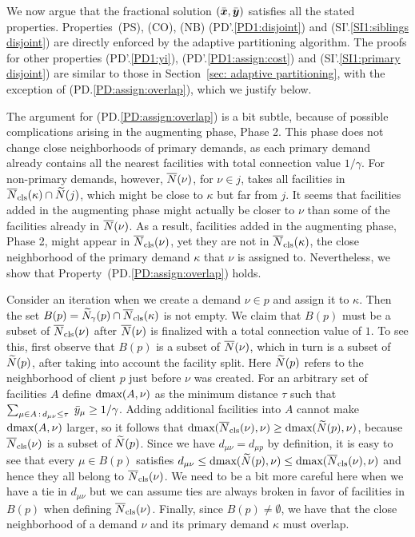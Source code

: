 \documentclass[11pt]{article}
\begin{document}
\smallskip

We now argue that the fractional solution $(\bar{\boldsymbol{x}},\bar{\boldsymbol{y}})$
satisfies all the stated properties. Properties~(PS), (CO), (NB)
(PD'.\ref{PD1:disjoint}) and (SI'.\ref{SI1:siblings disjoint}) are
directly enforced by the adaptive partitioning algorithm. The proofs
for other properties (PD'.\ref{PD1:yi}), (PD'.\ref{PD1:assign:cost})
and (SI'.\ref{SI1:primary disjoint}) are similar to those in
Section~\ref{sec: adaptive partitioning}, with the exception of
(PD.\ref{PD:assign:overlap}), which we justify below.

The argument for (PD.\ref{PD:assign:overlap}) is a bit subtle, because
of possible complications arising in the augmenting phase, Phase 2.
This phase does not change close neighborhoods of primary demands, as
each primary demand already contains all the nearest facilities with
total connection value $1/\gamma$.  For non-primary demands, however,
${\overline{N}}(\nu)$, for $\nu\in j$, takes all facilities in
${\overline{N}}_{\text{cls}}(\kappa)\cap {\widetilde N}(j)$, which might be close to $\kappa$
but far from $j$.  It seems that facilities added in the augmenting
phase might actually be closer to $\nu$ than some of the facilities
already in ${\overline{N}}(\nu)$. As a result, facilities added in the
augmenting phase, Phase 2, might appear in ${\overline{N}}_{\text{cls}}(\nu)$, yet they
are not in ${\overline{N}}_{\text{cls}}(\kappa)$, the close neighborhood of the primary
demand $\kappa$ that $\nu$ is assigned to.  Nevertheless, we show that
Property~(PD.\ref{PD:assign:overlap}) holds.

Consider an iteration when we create a demand $\nu\in p$
and assign it to $\kappa$. Then the set
$B(p)={\widetilde N}_{\gamma}(p)\cap {\overline{N}}_{\text{cls}}(\kappa)$ is not empty.
We claim that
$B(p)$ must be a subset of ${\overline{N}}_{\text{cls}}(\nu)$ after ${\overline{N}}(\nu)$ is
finalized with a total connection value of $1$. To see this, first
observe that $B(p)$ is a subset of ${\overline{N}}(\nu)$, which in turn is a
subset of ${\widetilde N}(p)$, after taking into account the facility
split. Here ${\widetilde N}(p)$ refers to the neighborhood of client $p$
just before $\nu$ was created. For an arbitrary set of facilities
$A$ define $\text{dmax}(A, \nu)$ as the minimum distance $\tau$ such
that $\sum_{\mu\in A {\,:\,} d_{\mu\nu} \leq \tau}\;{\bar y}_{\mu} \geq
1/\gamma$.
Adding additional facilities into $A$ cannot make
$\text{dmax}(A, \nu)$ larger, so it follows that $\text{dmax}({\overline{N}}_{\text{cls}}(\nu), \nu)
\geq \text{dmax}({\widetilde N}(p), \nu)$, because ${\overline{N}}_{\text{cls}}(\nu)$ is a subset of
${\widetilde N}(p)$. Since we have $d_{\mu \nu} = d_{\mu p}$ by definition,
it is easy to see that every $\mu \in B(p)$ satisfies $d_{\mu \nu}
\leq \text{dmax}({\widetilde N}(p), \nu) \leq \text{dmax}({\overline{N}}_{\text{cls}}(\nu), \nu)$ and
hence they all belong to ${\overline{N}}_{\text{cls}}(\nu)$. We need to be a bit more
careful here when we have a tie in $d_{\mu\nu}$ but we can assume ties
are always broken in favor of facilities in $B(p)$ when defining
${\overline{N}}_{\text{cls}}(\nu)$. Finally, since $B(p)\neq\emptyset$, we have that the
close neighborhood of a demand $\nu$ and its primary demand $\kappa$
must overlap.
\end{document}
